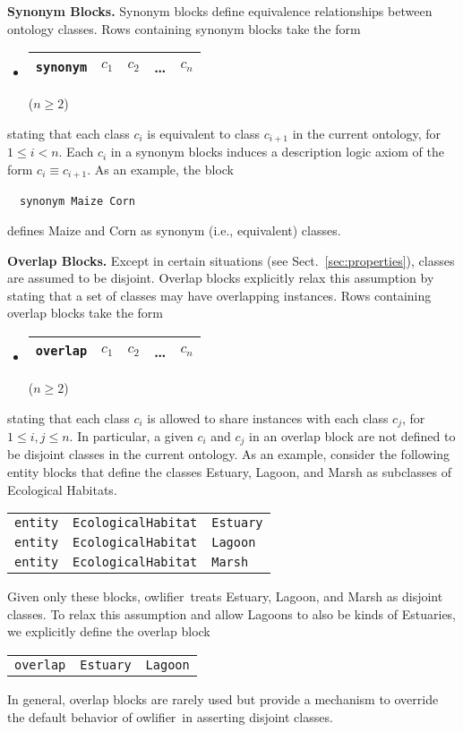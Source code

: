 \documentclass[preprint,number]{elsarticle}
\newcommand{\owlifier}{\textsf{owlifier}}
\newcommand{\myblock}[1]{\vspace{12pt}\noindent\textbf{#1}}
\newcommand{\secref}[1]{Sect.~\ref{#1}}
\begin{document}
\myblock{Synonym Blocks.} Synonym blocks define equivalence
relationships between ontology classes.  Rows containing synonym
blocks take the form
\begin{itemize}
\item[] 
  \begin{tabular}{|l|l|l|l|l|}\hline
    \texttt{synonym} & $c_1$ & $c_2$ & \dots & $c_n$ \\ \hline 
  \end{tabular} \hfill ($n \ge 2$)
\end{itemize}
stating that each class $c_i$ is equivalent to class $c_{i+1}$ in the
current ontology, for $1 \le i < n$. Each $c_i$ in a synonym blocks
induces a description logic axiom of the form $c_i \equiv c_{i+1}$. As
an example, the block
\begin{tabbing}
~~\texttt{synonym Maize Corn}
\end{tabbing}
defines Maize and Corn as synonym (i.e., equivalent) classes.


\myblock{Overlap Blocks.} Except in certain situations (see
\secref{sec:properties}), classes are assumed to be disjoint.  Overlap
blocks explicitly relax this assumption by stating that a set of
classes may have overlapping instances. Rows containing overlap blocks
take the form
\begin{itemize}
\item[] 
  \begin{tabular}{|l|l|l|l|l|}\hline
    \texttt{overlap} & $c_1$ & $c_2$ & \dots & $c_n$ \\ \hline 
  \end{tabular} \hfill ($n \ge 2$)
\end{itemize}
stating that each class $c_i$ is allowed to share instances with each
class $c_j$, for $1 \le i,j \le n$. In particular, a given $c_i$ and
$c_j$ in an overlap block are not defined to be disjoint classes in
the current ontology. As an example, consider the following entity
blocks that define the classes Estuary, Lagoon, and Marsh as
subclasses of Ecological Habitats.
\begin{tabbing}
\begin{tabular}{lll}
  \texttt{entity} & \texttt{EcologicalHabitat} & \texttt{Estuary} \\ 
  \texttt{entity} & \texttt{EcologicalHabitat} & \texttt{Lagoon} \\ 
  \texttt{entity} & \texttt{EcologicalHabitat} & \texttt{Marsh} \\ 
\end{tabular}
\end{tabbing}
Given only these blocks, \owlifier\ treats Estuary, Lagoon, and Marsh
as disjoint classes. To relax this assumption and allow Lagoons to
also be kinds of Estuaries, we explicitly define the overlap block
\begin{tabbing}
\begin{tabular}{lll}
  \texttt{overlap} & \texttt{Estuary} & \texttt{Lagoon}
\end{tabular}
\end{tabbing}
In general, overlap blocks are rarely used but provide a mechanism to
override the default behavior of \owlifier\ in asserting disjoint
classes.
\end{document}

